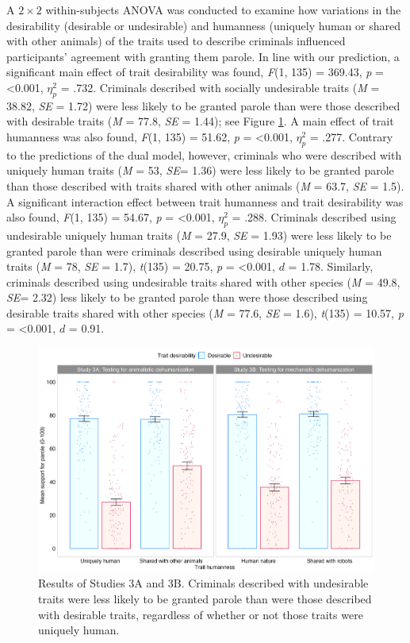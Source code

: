 \documentclass[
]{article}
\begin{document}
A \(2 \times 2\) within-subjects ANOVA was conducted to examine how variations in the desirability (desirable or undesirable) and humanness (uniquely human or shared with other animals) of the traits used to describe criminals influenced participants' agreement with granting them parole. In line with our prediction, a significant main effect of trait desirability was found, \emph{F}(1, 135) = 369.43, \emph{p} = \textless0.001, \(\eta_{p}^{2}\) = .732. Criminals described with socially undesirable traits (\emph{M} = 38.82, \emph{SE} = 1.72) were less likely to be granted parole than were those described with desirable traits (\emph{M} = 77.8, \emph{SE} = 1.44); see Figure \ref{fig:figure3}. A main effect of trait humanness was also found, \emph{F}(1, 135) = 51.62, \emph{p} = \textless0.001, \(\eta_{p}^{2}\) = .277. Contrary to the predictions of the dual model, however, criminals who were described with uniquely human traits (\emph{M} = 53, \emph{SE}= 1.36) were less likely to be granted parole than those described with traits shared with other animals (\emph{M} = 63.7, \emph{SE} = 1.5). A significant interaction effect between trait humanness and trait desirability was also found, \emph{F}(1, 135) = 54.67, \emph{p} = \textless0.001, \(\eta_{p}^{2}\) = .288. Criminals described using undesirable uniquely human traits (\emph{M} = 27.9, \emph{SE} = 1.93) were less likely to be granted parole than were criminals described using desirable uniquely human traits (\emph{M} = 78, \emph{SE} = 1.7), \emph{t}(135) = 20.75, \emph{p} = \textless0.001, \(d\) = 1.78. Similarly, criminals described using undesirable traits shared with other species (\emph{M} = 49.8, \emph{SE}= 2.32) less likely to be granted parole than were those described using desirable traits shared with other species (\emph{M} = 77.6, \emph{SE} = 1.6), \emph{t}(135) = 10.57, \emph{p} = \textless0.001, \(d\) = 0.91.

\begin{figure}

{\centering \includegraphics[width=0.9\linewidth]{figures/plot3} 

}

\caption{Results of Studies 3A and 3B.  Criminals described with undesirable traits were less likely to be granted parole than were those described with desirable traits, regardless of whether or not those traits were uniquely human.}\label{fig:figure3}
\end{figure}
\end{document}
